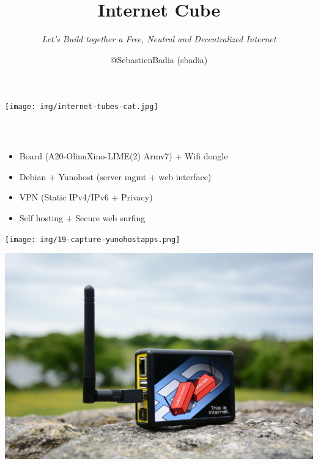 \documentclass[notes=hide]{beamer}
\title{\Huge Internet Cube}
\subtitle{\vspace{.2cm}\emph{Let's Build together a Free, Neutral and Decentralized Internet}}
\institute{\textbf{Mini-DebConf - Curitiba}}
\author{@SebastienBadia (sbadia)}
\begin{document}
\begin{frame}[t,plain]
\titlepage
\end{frame}

\watermarkoff

\begin{frame}[t,plain]
\begin{center}
  \vspace{\fill}
  \texttt{[image: img/internet-tubes-cat.jpg]}
  \vspace{\fill}
\end{center}
\end{frame}

\begin{frame}
\frametitle{\textcolor{white}{Internet Cube}}
  \begin{itemize}
    \item Board (A20-OlinuXino-LIME(2) Armv7) + Wifi dongle
      \pause
    \item Debian + Yunohost (server mgmt + web interface)
      \pause
    \item VPN (Static IPv4/IPv6 + Privacy)
      \pause
    \item Self hosting + Secure web surfing
  \end{itemize}
\end{frame}

\begin{frame}[t]
\begin{center}
\vfill
\texttt{[image: img/19-capture-yunohostapps.png]}
\vfill
\end{center}
\end{frame}

\begin{frame}[t,plain]
\begin{center}
  \vspace{\fill}
  \includegraphics[width=\textwidth]{img/labriqueinternet-nature.png}
  \vspace{\fill}
\end{center}
\end{frame}
\end{document}

